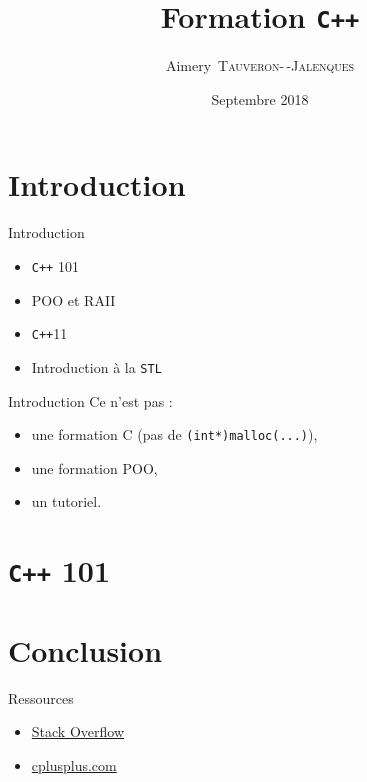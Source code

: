 \documentclass{beamer}
\title{Formation \texttt{C++}}
\date{Septembre 2018}
\author[A.~\textsc{Tauveron}]{Aimery~\textsc{Tauveron-\,-Jalenques}}
\institute{ViaRézo}
\numberwithin{equation}{section}
\begin{document}
\lstset{breaklines=true, showstringspaces=false}
\lstset{language=[11]C++}

\frame{\titlepage}


\frame{\tableofcontents}

\section{Introduction}
\label{sec:introduction}

\begin{frame}{Introduction}
  \begin{itemize}
    \item \texttt{C++} 101
    \item POO et RAII
    \item \texttt{C++}11
    \item Introduction à la \texttt{STL}
  \end{itemize}
\end{frame}

\begin{frame}{Introduction}
  Ce n'est pas :
  \begin{itemize}
    \item une formation C (pas de \texttt{(int*)malloc(...)}),
    \item une formation POO,
    \item un tutoriel.
  \end{itemize}
\end{frame}


\section{\texttt{C++} 101}
\label{sec:cpp101}



\section{Conclusion}
\label{sec:conclusion}
\begin{frame}{Ressources}
  \begin{itemize}
    \item \href{https://stackoverflow.com/}{Stack Overflow}
    \item \href{http://www.cplusplus.com/}{cplusplus.com}
  \end{itemize}
\end{frame}
\end{document}

